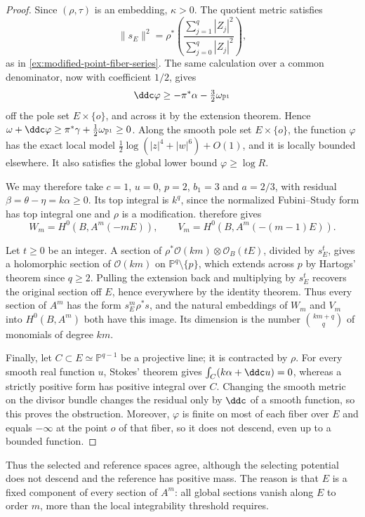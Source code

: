 \begin{proof}
Since $(\rho,\tau)$ is an embedding, $\kappa>0$. The quotient metric satisfies
\[
 \|s_E\|^2=\rho^*\left(\frac{\sum_{j=1}^q|Z_j|^2}
                                  {\sum_{j=0}^q|Z_j|^2}\right),
\]
as in \cref{ex:modified-point-fiber-series}. The same calculation over a common denominator, now with coefficient $1/2$, gives
\[
 \ddc\varphi\geq-\pi^*\alpha-\tfrac32\omega_{\mathbb P^1}
\]
off the pole set $E\times\{o\}$, and across it by the extension theorem. Hence $\omega+\ddc\varphi\geq\pi^*\gamma+\tfrac12\omega_{\mathbb P^1}\geq0$. Along the smooth pole set $E\times\{o\}$, the function $\varphi$ has the exact local model $\tfrac12\log(|z|^4+|w|^6)+O(1)$, and it is locally bounded elsewhere. It also satisfies the global lower bound $\varphi\geq\log R$.

We may therefore take $c=1$, $u=0$, $p=2$, $b_1=3$ and $a=2/3$, with residual $\beta=\theta-\eta=k\alpha\geq0$. Its top integral is $k^q$, since the normalized Fubini--Study form has top integral one and $\rho$ is a modification.  therefore gives
\[
 W_m=H^0(B,A^m(-mE)),\qquad
 V_m=H^0(B,A^m(-(m-1)E)).
\]

Let $t\geq0$ be an integer. A section of $\rho^*\mathcal O(km)\otimes\mathcal O_B(tE)$, divided by $s_E^t$, gives a holomorphic section of $\mathcal O(km)$ on $\mathbb P^q\setminus\{p\}$, which extends across $p$ by Hartogs' theorem since $q\geq2$. Pulling the extension back and multiplying by $s_E^t$ recovers the original section off $E$, hence everywhere by the identity theorem. Thus every section of $A^m$ has the form $s_E^m\rho^*s$, and the natural embeddings of $W_m$ and $V_m$ into $H^0(B,A^m)$ both have this image. Its dimension is the number $\binom{km+q}{q}$ of monomials of degree $km$.

Finally, let $C\subset E\simeq\mathbb P^{q-1}$ be a projective line; it is contracted by $\rho$. For every smooth real function $u$, Stokes' theorem gives $\int_C(k\alpha+\ddc u)=0$, whereas a strictly positive form has positive integral over $C$. Changing the smooth metric on the divisor bundle changes the residual only by $\ddc$ of a smooth function, so this proves the obstruction. Moreover, $\varphi$ is finite on most of each fiber over $E$ and equals $-\infty$ at the point $o$ of that fiber, so it does not descend, even up to a bounded function.
\end{proof}

Thus the selected and reference spaces agree, although the selecting potential does not descend and the reference has positive mass. The reason is that $E$ is a fixed component of every section of $A^m$: all global sections vanish along $E$ to order $m$, more than the local integrability threshold requires.



